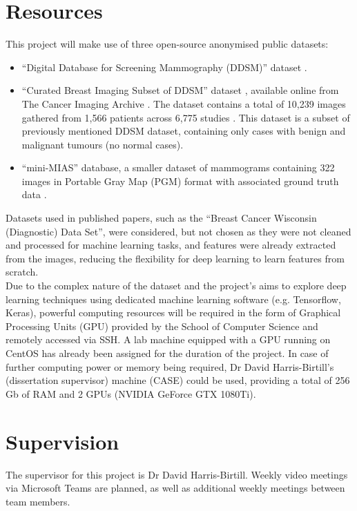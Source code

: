 \documentclass[letterpaper,12pt]{article}
\begin{document}

\section{Resources}
\label{sec:resources}

This project will make use of three open-source anonymised public datasets:
\begin{itemize}
    \item ``Digital Database for Screening Mammography (DDSM)'' dataset \cite{DDSMdataset2001}.
    \item ``Curated Breast Imaging Subset of DDSM'' dataset \cite{Lee2017}, available online from The Cancer Imaging Archive \cite{Clark2013}. The dataset contains a total of 10,239 images gathered from 1,566 patients across 6,775 studies \cite{Lee2017}. This dataset is a subset of previously mentioned DDSM dataset, containing only cases with benign and malignant tumours (no normal cases).
    \item ``mini-MIAS'' database, a smaller dataset of mammograms containing 322 images in Portable Gray Map (PGM) format with associated ground truth data \cite{Suckling1994}.
\end{itemize}

Datasets used in published papers, such as the ``Breast Cancer Wisconsin (Diagnostic) Data Set'', were considered, but not chosen as they were not cleaned and processed for machine learning tasks, and features were already extracted from the images, reducing the flexibility for deep learning to learn features from scratch.\\

Due to the complex nature of the dataset and the project's aims to explore deep learning techniques using dedicated machine learning software (e.g. Tensorflow, Keras), powerful computing resources will be required in the form of Graphical Processing Units (GPU) provided by the School of Computer Science and remotely accessed via SSH. A lab machine equipped with a GPU running on CentOS has already been assigned for the duration of the project. In case of further computing power or memory being required, Dr David Harris-Birtill's (dissertation supervisor) machine (CASE) could be used, providing a total of 256 Gb of RAM and 2 GPUs (NVIDIA GeForce GTX 1080Ti).


\section{Supervision}
\label{sec:supervisor}

The supervisor for this project is Dr David Harris-Birtill. Weekly video meetings via Microsoft Teams are planned, as well as additional weekly meetings between team members.


\begin{appendices}

\clearpage



\end{appendices}
\end{document}
